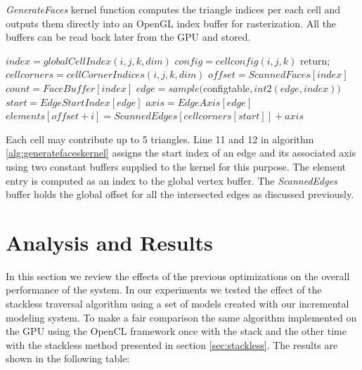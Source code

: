 \begin{algorithm}[H]
\caption{\textit{GenerateFaces} kernel function computes the triangle indices per each cell and outputs them directly into an
OpenGL index buffer for rasterization. All the buffers can be read back later from the GPU and stored.}
\label{alg:generatefaceskernel}
\begin{algorithmic}[1]	 
  \STATE $index = globalCellIndex(i, j, k, dim)$
  \STATE $config = cellconfig(i, j, k)$
	  \STATE return;
	  \ENDIF	
   \STATE $cellcorners = cellCornerIndices(i, j, k, dim)$
   \STATE $offset = ScannedFaces[index]$
   \STATE $count = FaceBuffer[index]$
	 \STATE $edge = sample($configtable$, int2(edge, index))$
	 \STATE $start = EdgeStartIndex[edge]$
	 \STATE $axis = EdgeAxis[edge]$
	 \STATE $elements[offset + i] = ScannedEdges[cellcorners[start]] + axis$
   \ENDFOR				

\end{algorithmic}
\end{algorithm}


Each cell may contribute up to 5 triangles. Line 11 and 12 in algorithm \ref{alg:generatefaceskernel} 
assigns the start index of an edge and its associated axis using two constant buffers supplied to the kernel for this purpose. 
The element entry is computed as an index to the global vertex buffer. The \textit{ScannedEdges} 
buffer holds the global offset for all the intersected edges as discussed previously. 

\section{Analysis and Results}
In this section we review the effects of the previous optimizations on the overall performance of the system.
In our experiments we tested the effect of the stackless \blob traversal algorithm using a set of models created 
with our incremental modeling system. To make a fair comparison the same algorithm implemented on the GPU using
the OpenCL framework once with the stack and the other time with the stackless method presented in section 
\ref{sec:stackless}. The results are shown in the following table:



